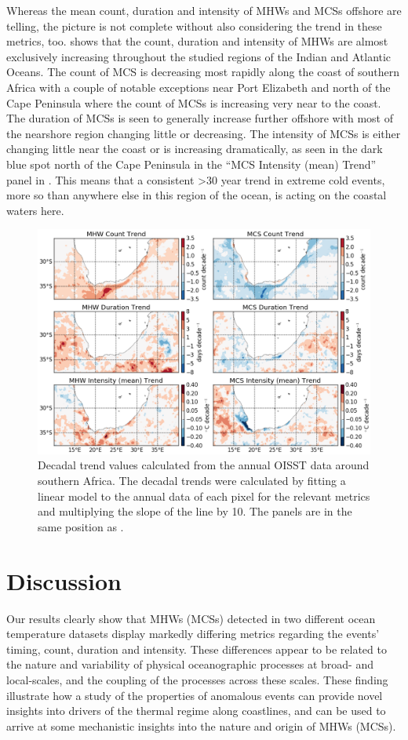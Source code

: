 \documentclass[a4paper,10pt,review]{elsarticle}
\begin{document}
Whereas the mean count, duration and intensity of MHWs and MCSs offshore are telling, the picture is not complete without also considering the trend in these metrics, too.  shows that the count, duration and intensity of MHWs are almost exclusively increasing throughout the studied regions of the Indian and Atlantic Oceans. The count of MCS is decreasing most rapidly along the coast of southern Africa with a couple of notable exceptions near Port Elizabeth and north of the Cape Peninsula where the count of MCSs is increasing very near to the coast. The duration of MCSs is seen to generally increase further offshore with most of the nearshore region changing little or decreasing. The intensity of MCSs is either changing little near the coast or is increasing dramatically, as seen in the dark blue spot north of the Cape Peninsula in the ``MCS Intensity (mean) Trend'' panel in . This means that a consistent >30 year trend in extreme cold events, more so than anywhere else in this region of the ocean, is acting on the coastal waters here.

\begin{figure}
\centering \includegraphics[width=1.0\textwidth]{MHW_MCS_trend.png}
\caption{Decadal trend values calculated from the annual OISST data around southern Africa. The decadal trends were calculated by fitting a linear model to the annual data of each pixel for the relevant metrics and multiplying the slope of the line by 10. The panels are in the same position as .}
\label{fig:Figure7}
\end{figure}

\section{Discussion}
Our results clearly show that MHWs (MCSs) detected in two different ocean temperature datasets display markedly differing metrics regarding the events' timing, count, duration and intensity. These differences appear to be related to the nature and variability of physical oceanographic processes at broad- and local-scales, and the coupling of the processes across these scales. These finding illustrate how a study of the properties of anomalous events can provide novel insights into drivers of the thermal regime along coastlines, and can be used to arrive at some mechanistic insights into the nature and origin of MHWs (MCSs).
\end{document}
